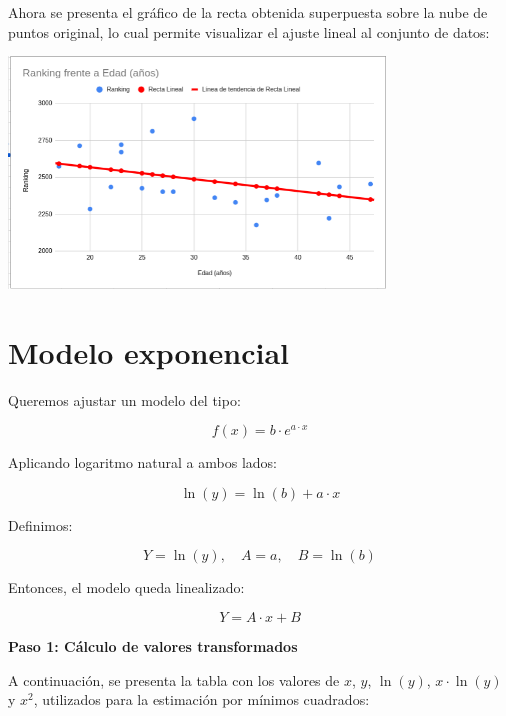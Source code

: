 \documentclass[12pt]{article}
\begin{document}
    \vspace{1cm}
        Ahora se presenta el gráfico de la recta obtenida superpuesta sobre la nube de puntos original, lo cual permite visualizar el ajuste lineal al conjunto de datos:

    \vspace{0.5cm}

    \begin{center}
        \includegraphics[width=0.75\textwidth]{rectaNubeDePuntos.png}
    \end{center}







\section*{Modelo exponencial}

Queremos ajustar un modelo del tipo:

\[
f(x) = b \cdot e^{a \cdot x}
\]

Aplicando logaritmo natural a ambos lados:

\[
\ln(y) = \ln(b) + a \cdot x
\]

Definimos:

\[
Y = \ln(y), \quad A = a, \quad B = \ln(b)
\]

Entonces, el modelo queda linealizado:

\[
Y = A \cdot x + B
\]

\vspace{0.5cm}
\textbf{ Paso 1: Cálculo de valores transformados}

A continuación, se presenta la tabla con los valores de \( x \), \( y \), \( \ln(y) \), \( x \cdot \ln(y) \) y \( x^2 \), utilizados para la estimación por mínimos cuadrados:

\vspace{0.3cm}
\end{document}
